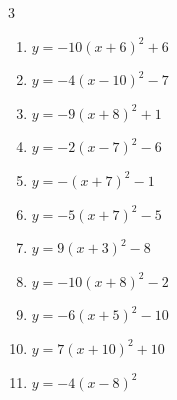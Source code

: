 \begin{multicols}{3}
\begin{enumerate}
  \item $\displaystyle y=-10\left( x+6\right)^{2}+6$

        \phantom{$\displaystyle 頂点\left( -6 , 6 \right)$}

  \item $\displaystyle y=-4\left( x-10\right)^{2}-7$

        \phantom{$\displaystyle 頂点\left( 10 , -7 \right)$}

  \item $\displaystyle y=-9\left( x+8\right)^{2}+1$

        \phantom{$\displaystyle 頂点\left( -8 , 1 \right)$}

  \item $\displaystyle y=-2\left( x-7\right)^{2}-6$

        \phantom{$\displaystyle 頂点\left( 7 , -6 \right)$}

  \item $\displaystyle y=-\left( x+7\right)^{2}-1$

        \phantom{$\displaystyle 頂点\left( -7 , -1 \right)$}

  \item $\displaystyle y=-5\left( x+7\right)^{2}-5$

        \phantom{$\displaystyle 頂点\left( -7 , -5 \right)$}

  \item $\displaystyle y=9\left( x+3\right)^{2}-8$

        \phantom{$\displaystyle 頂点\left( -3 , -8 \right)$}

  \item $\displaystyle y=-10\left( x+8\right)^{2}-2$

        \phantom{$\displaystyle 頂点\left( -8 , -2 \right)$}

\columnbreak %

  \item $\displaystyle y=-6\left( x+5\right)^{2}-10$

        \phantom{$\displaystyle 頂点\left( -5 , -10 \right)$}

  \item $\displaystyle y=7\left( x+10\right)^{2}+10$

        \phantom{$\displaystyle 頂点\left( -10 , 10 \right)$}

  \item $\displaystyle y=-4\left( x-8\right)^{2}$

        \phantom{$\displaystyle 頂点\left( 8 , 0 \right)$}


\end{enumerate}
\end{multicols}
